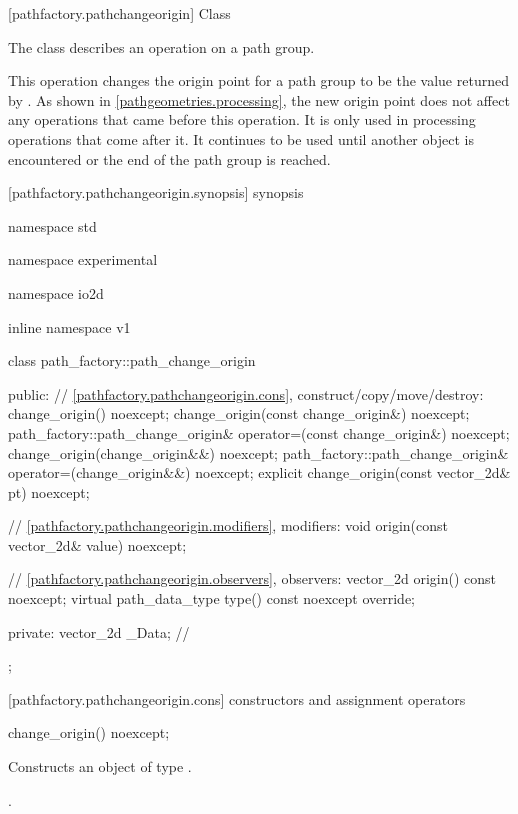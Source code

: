  [pathfactory.pathchangeorigin] {Class }

\pnum
{}
The class  describes an operation on a path group.

\pnum
This operation changes the origin point for a path group to be the value returned by . As shown in \ref{pathgeometries.processing}, the new origin point does not affect any operations that came before this operation. It is only used in processing operations that come after it. It continues to be used until another  object is encountered or the end of the path group is reached.

 [pathfactory.pathchangeorigin.synopsis] { synopsis}

\begin{codeblock}
namespace std { namespace experimental { namespace io2d { inline namespace v1 {
  class path_factory::path_change_origin {
  public:
    // \ref{pathfactory.pathchangeorigin.cons}, construct/copy/move/destroy:
    change_origin() noexcept;
    change_origin(const change_origin&) noexcept;
    path_factory::path_change_origin& operator=(const change_origin&) noexcept;
    change_origin(change_origin&&) noexcept;
    path_factory::path_change_origin& operator=(change_origin&&) noexcept;
    explicit change_origin(const vector_2d& pt) noexcept;

    // \ref{pathfactory.pathchangeorigin.modifiers}, modifiers:
    void origin(const vector_2d& value) noexcept;

    // \ref{pathfactory.pathchangeorigin.observers}, observers:
    vector_2d origin() const noexcept;
    virtual path_data_type type() const noexcept override;
    
  private:
    vector_2d _Data; // \expos
  };
} } } }
\end{codeblock}

 [pathfactory.pathchangeorigin.cons] { constructors and assignment operators}

\begin{itemdecl}
    change_origin() noexcept;
\end{itemdecl}
\begin{itemdescr}
	\pnum
	\effects
	Constructs an object of type .
	
	\pnum
	\postconditions
	.
\end{itemdescr}

